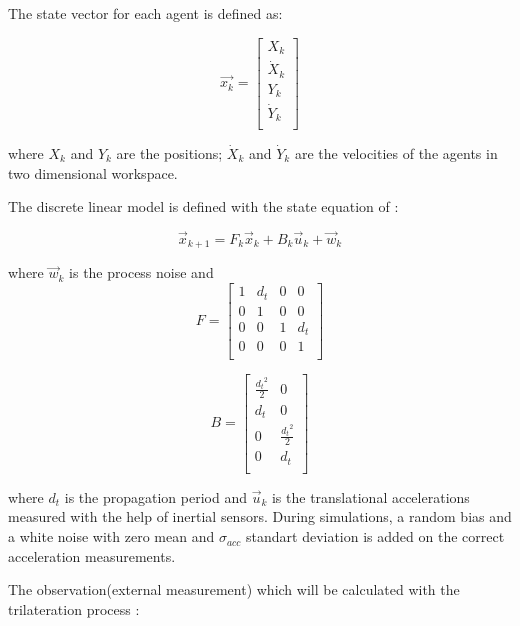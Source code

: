 The state vector for each agent is defined as:

\begin{equation}
\vec{x_k} = \begin{bmatrix}
X_k \\
\dot{X}_k\\
Y_k \\
\dot{Y}_k\\
\end{bmatrix}
\end{equation}
	
where $X_k$ and $Y_k$ are the positions; $\dot{X}_k$ and $\dot{Y}_k$ are the velocities of the agents in two dimensional workspace.

The discrete linear model is defined with the state equation of \cite{wiki_kalman}:

\begin{equation}
{\vec{x}}_{k+1} = F_k {\vec{x}}_{k} + B_k {\vec{u}}_k +  {\vec{w}}_k
\end{equation}
	
where ${\vec{w}}_k$ is the process noise and 
\begin{equation}
F = \begin{bmatrix}
1 & d_t & 0 & 0 \\
0 & 1 & 0 & 0 \\
0 & 0 & 1 & d_t \\
0 & 0 & 0 & 1 \\
\end{bmatrix}   
\end{equation}
	
\begin{equation}
B = \begin{bmatrix}
\frac{{d_t}^2}{2} & 0 \\
d_t  & 0 \\
0  & \frac{{d_t}^2}{2} \\
   0 & d_t \\
\end{bmatrix}
\end{equation}

where $d_t$ is the propagation period and ${\vec{u}}_k$ is the translational accelerations measured with the help of inertial sensors. During simulations, a random bias and a white noise with zero mean and $\sigma_{acc}$ standart deviation is added on the correct acceleration measurements. 

The observation(external measurement) which will be calculated with the trilateration process :

